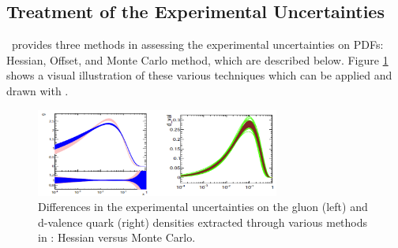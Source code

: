 \subsection{Treatment of the Experimental Uncertainties}

\fitter\ provides three methods in assessing the experimental uncertainties on PDFs: Hessian, Offset, and Monte Carlo method, which are described below.
Figure \ref{fig:error} shows a visual illustration of these various techniques which can be applied and drawn with \fitter.
\begin{figure}[!ht]
   \centering
   \includegraphics[width=8cm]{error.pdf}
   \caption{Differences in the experimental uncertainties on the gluon (left) and d-valence quark (right) densities extracted through various methods in \fitter: Hessian versus Monte Carlo.} 
 \label{fig:error}
\end{figure}
